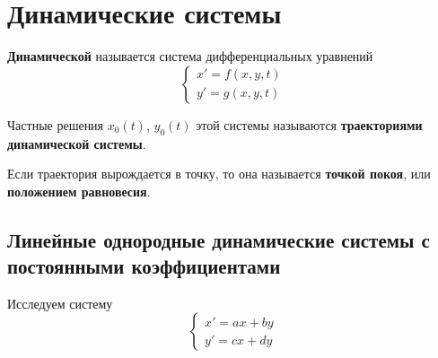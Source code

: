 \section{Динамические системы}
 \textbf{Динамической} называется система дифференциальных уравнений
\begin{equation*}
\begin{cases}
x' = f(x, y, t) \\
y' = g(x, y, t)
\end{cases}
\end{equation*}

Частные решения $x_0(t)$, $y_0(t)$ этой системы называются \textbf{траекториями динамической системы}.

Если траектория вырождается в точку, то она называется \textbf{точкой покоя}, или \textbf{положением равновесия}.

\subsection{Линейные однородные динамические системы с постоянными коэффициентами}
Исследуем систему
\begin{equation*}
\begin{cases}
x' = ax + by \\
y' = cx + dy
\end{cases}
\end{equation*}

